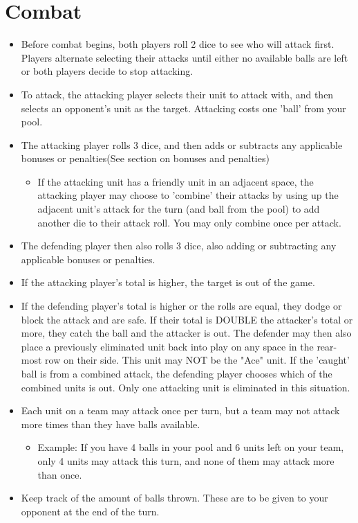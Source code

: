 \documentclass[10pt]{article}
\begin{document}
\section*{Combat}
\begin{itemize}
\item Before combat begins, both players roll 2 dice to see who will attack first. Players alternate selecting their attacks until either no available balls are left or both players decide to stop attacking.
\item To attack, the attacking player selects their unit to attack with, and then selects an opponent's unit as the target. Attacking costs one 'ball' from your pool.
\item The attacking player rolls 3 dice, and then adds or subtracts any applicable bonuses or penalties(See section on bonuses and penalties)
	\begin{itemize}
	\item If the attacking unit has a friendly unit in an adjacent space, the attacking player may choose to 'combine' their attacks by using up the adjacent unit's attack for the turn (and ball from the pool) to add another die to their attack roll. You may only combine once per attack.
	\end{itemize}
\item The defending player then also rolls 3 dice, also adding or subtracting any applicable bonuses or penalties.
\item If the attacking player's total is higher, the target is out of the game.
\item If the defending player's total is higher or the rolls are equal, they dodge or block the attack and are safe. If their total is DOUBLE the attacker's total or more, they catch the ball and the attacker is out. The defender may then also place a previously eliminated unit back into play on any space in the rear-most row on their side. This unit may NOT be the "Ace" unit. If the 'caught' ball is from a combined attack, the defending player chooses which of the combined units is out. Only one attacking unit is eliminated in this situation.
\item Each unit on a team may attack once per turn, but a team may not attack more times than they have balls available.
	\begin{itemize}
	\item Example: If you have 4 balls in your pool and 6 units left on your team, only 4 units may attack this turn, and none of them may attack more than once.
	\end{itemize}
\item Keep track of the amount of balls thrown. These are to be given to your opponent at the end of the turn.
\end{itemize}
\newpage
\end{document}
